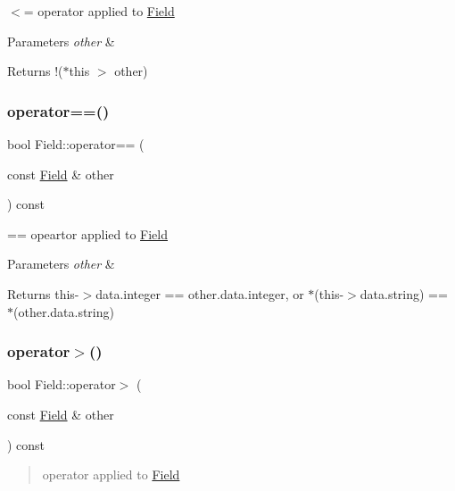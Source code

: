 $<$= operator applied to \hyperlink{struct_field}{Field}


\begin{DoxyParams}{Parameters}
{\em other} & \\
\hline
\end{DoxyParams}
\begin{DoxyReturn}{Returns}
!($\ast$this $>$ other) 
\end{DoxyReturn}
\mbox{\label{struct_field_a1e63e67061b37ff2539b8f6bc7d5adeb}} 
\subsubsection{\texorpdfstring{operator==()}{operator==()}}
{\footnotesize\ttfamily bool Field\+::operator== (\begin{DoxyParamCaption}\item[{const \hyperlink{struct_field}{Field} \&}]{other }\end{DoxyParamCaption}) const}

== opeartor applied to \hyperlink{struct_field}{Field}


\begin{DoxyParams}{Parameters}
{\em other} & \\
\hline
\end{DoxyParams}
\begin{DoxyReturn}{Returns}
this-\/$>$data.\+integer == other.\+data.\+integer, or $\ast$(this-\/$>$data.\+string) == $\ast$(other.\+data.\+string) 
\end{DoxyReturn}
\mbox{\label{struct_field_a768b337c79d52b58e52340cf546414c0}} 
\subsubsection{\texorpdfstring{operator$>$()}{operator>()}}
{\footnotesize\ttfamily bool Field\+::operator$>$ (\begin{DoxyParamCaption}\item[{const \hyperlink{struct_field}{Field} \&}]{other }\end{DoxyParamCaption}) const}

\begin{quote}
operator applied to \hyperlink{struct_field}{Field} \end{quote}



